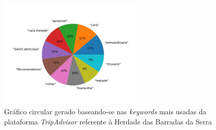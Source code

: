 \begin{figure}[!htb]
\centering
\includegraphics[width=7cm]{figuras/TripAdvisor/Hotels/hotel21_keywords.jpeg}
\caption{Gráfico circular gerado baseando-se nas \textit{keywords} mais usadas da plataforma \textit{TripAdvisor} referente à Herdade das Barradas da Serra}
\label{fig:exemplofig}
\end{figure}

